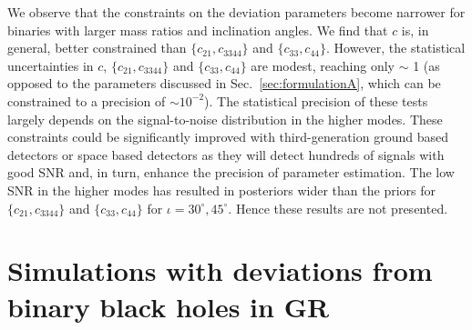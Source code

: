 \documentclass[prd,preprintnumbers,twocolumn,eqsecnum,floatfix,a4paper,nofootinbib,superscriptaddress]{revtex4}
\begin{document}
We observe that the constraints on the deviation parameters become narrower for binaries with larger mass ratios and inclination angles. We find that $c$ is, in general, better constrained than $\{c_{21}, c_{3344}\}$ and $\{c_{33}, c_{44}\}$. However, the statistical uncertainties in $c$, $\{c_{21}, c_{3344}\}$ and $\{c_{33}, c_{44}\}$ are modest, reaching only $\sim$ 1 (as opposed to the parameters discussed in Sec.~\ref{sec:formulationA}, which can be constrained to a precision of $\sim 10^{-2}$). The statistical precision of these tests largely depends on the signal-to-noise distribution in the higher modes. These constraints could be significantly improved with third-generation ground based detectors or space based detectors as they will detect hundreds of signals with good SNR and, in turn, enhance the precision of parameter estimation. The low SNR in the higher modes has resulted in posteriors wider than the priors for $\{c_{21}, c_{3344}\}$ and $\{c_{33}, c_{44}\}$ for $\iota={30^{\circ},45^{\circ}}$. Hence these results are not presented. 


\section{Simulations with deviations from binary black holes in GR}
\label{sec:simulation_nonbbh}
\end{document}
